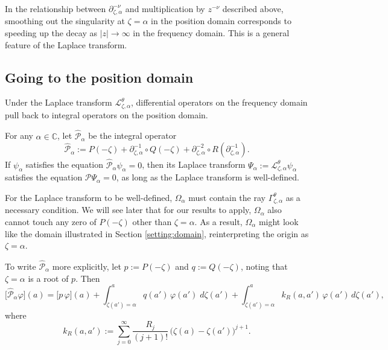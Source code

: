 \documentclass[final]{siamart220329}
\newcommand{\C}{\mathbb{C}}
\newcommand{\laplace}{\mathcal{L}}
\newcommand{\fracderiv}[3]{\partial^{#1}_{#2, #3}}
\newcommand{\domain}{\Omega}
\newenvironment{revtwo}{\color{revred}}{\color{black}}
\newenvironment{revtwo}{}{}
\begin{document}
\begin{rmk}
In the relationship between $\fracderiv{-\nu}{\zeta}{\alpha}$ and multiplication by $z^{-\nu}$ described above, smoothing out the singularity at $\zeta = \alpha$ in the position domain corresponds to speeding up the decay as $|z| \to \infty$ in the frequency domain. This is a general feature of the Laplace transform.
\end{rmk}
\subsection{Going to the position domain}
Under the Laplace transform $\laplace_{\zeta,\alpha}^{\theta}$, differential operators on the frequency domain pull back to integral operators on the position domain.
\begin{lemma}\label{lem:use-dict}
For any $\alpha \in \C$, let $\hat{\mathcal{P}}_{\alpha}$ be the integral operator 
\[ \hat{\mathcal{P}}_\alpha:=P(-\zeta)+\partial_{\zeta,\alpha}^{-1}\circ Q(-\zeta)+\partial_{\zeta,\alpha}^{-2}\circ R(\partial_{\zeta,\alpha}^{-1}). \]
If $\psi_\alpha$ satisfies the equation $\hat{\mathcal{P}}_\alpha\psi_\alpha=0$, then its Laplace transform $\Psi_\alpha:=\laplace_{\zeta,\alpha}^{\theta}\psi_\alpha$ satisfies the equation $\mathcal{P}\Psi_\alpha=0$, as long as the Laplace transform is well-defined.
\end{lemma}
\begin{rmk}
For the Laplace transform to be well-defined, $\domain_\alpha$ must contain the ray $\Gamma_{\zeta, \alpha}^\theta$ as a necessary condition. We will see later that for our results to apply, $\domain_\alpha$ also cannot touch any zero of $P(-\zeta)$ other than $\zeta = \alpha$. As a result, $\domain_\alpha$ might look like the domain illustrated in Section \ref{setting:domain}, reinterpreting the origin as $\zeta = \alpha$. 
\end{rmk}
\begin{rmk}\label{rmk:use-dict-explicit}
To write $\hat{\mathcal{P}}_\alpha$ more explicitly, let $p := P(-\zeta)$ and $q := Q(-\zeta)$, noting that $\zeta = \alpha$ is a root of $p$. Then
\begin{revtwo}
\[ \big[\hat{\mathcal{P}}_\alpha\varphi\big](a) = \big[ p\, \varphi \big](a) + \int_{\zeta(a')=\alpha}^a q(a') \, \varphi(a') \; d\zeta(a') + \int_{\zeta(a')=\alpha}^a k_R(a, a') \, \varphi(a') \, d\zeta(a'), \]
\end{revtwo}
where
\[ k_R(a,a') := \sum_{j=0}^\infty \frac{R_{j}}{(j+1)!} \, \big(\zeta(a)-\zeta(a')\big)^{j+1} . \]
\end{rmk}
\end{document}
